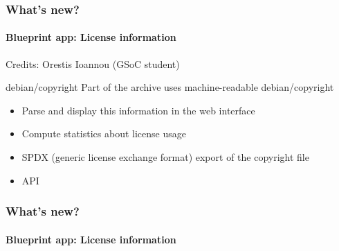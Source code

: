 \documentclass{beamer}
\begin{document}
\begin{frame}
  \frametitle{What's new?}
  \framesubtitle{Blueprint app: License information}
  Credits: Orestis Ioannou (GSoC student)

  \begin{block}{debian/copyright}
    Part of the archive uses \alert{machine-readable debian/copyright}
    \pause
    \begin{itemize}
    \item Parse and display this information in the web interface
      \pause
    \item Compute statistics about license usage
      \pause
    \item SPDX (generic license exchange format) export of the
      copyright file
      \pause
    \item API
    \end{itemize}
  \end{block}

\end{frame}

\begin{frame}
  \frametitle{What's new?}
  \framesubtitle{Blueprint app: License information}
\end{frame}
\end{document}
